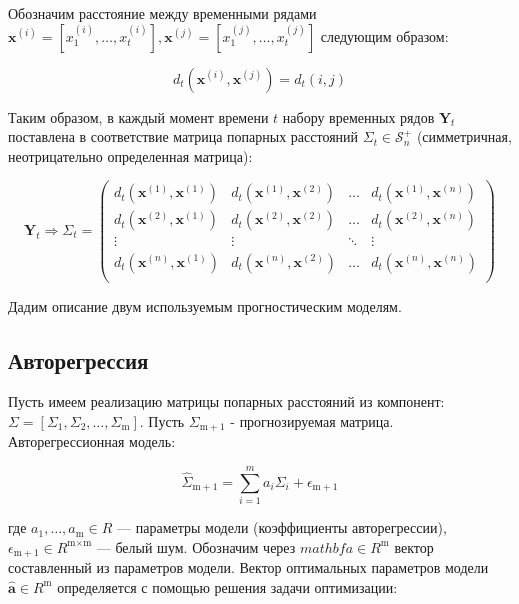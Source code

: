 \documentclass{article}
\begin{document}
Обозначим расстояние между временными рядами $\mathbf{x}^{(i)} = [x_1^{(i)}, \ldots, x_t^{(i)}], \mathbf{x}^{(j)} = [x^{(j)}_1, \ldots, x^{(j)}_t]$ следующим образом:

\begin{equation}
    d_t(\mathbf{x}^{(i)}, \mathbf{x}^{(j)}) = d_t(i, j)
\end{equation}

Таким образом, в каждый момент времени $t$ набору временных рядов $\mathbf{Y}_t$ поставлена в соответствие матрица попарных расстояний $\Sigma_t \in \mathcal{S}_n^+$ (симметричная, неотрицательно определенная матрица):

\begin{equation}
    \mathbf{Y}_t \Rightarrow \Sigma_t = \left(
\begin{array}{cccc}
d_t(\mathbf{x}^{(1)}, \mathbf{x}^{(1)}) & d_t(\mathbf{x}^{(1)}, \mathbf{x}^{(2)}) & \ldots & d_t(\mathbf{x}^{(1)}, \mathbf{x}^{(n)})\\
d_t(\mathbf{x}^{(2)}, \mathbf{x}^{(1)}) & d_t(\mathbf{x}^{(2)}, \mathbf{x}^{(2)}) & \ldots & d_t(\mathbf{x}^{(2)}, \mathbf{x}^{(n)})\\
\vdots & \vdots & \ddots & \vdots\\
d_t(\mathbf{x}^{(n)}, \mathbf{x}^{(1)}) & d_t(\mathbf{x}^{(n)}, \mathbf{x}^{(2)}) & \ldots & d_t(\mathbf{x}^{(n)}, \mathbf{x}^{(n)})\\
\end{array}
\right)
\end{equation}

Дадим описание двум используемым прогностическим моделям.

\subsection{Авторегрессия}

Пусть имеем реализацию матрицы попарных расстояний из  компонент: $\Sigma = [\Sigma_1, \Sigma_2, \ldots, \Sigma_\text{m}]$. Пусть $\Sigma_{\text{m} + 1}$ - прогнозируемая матрица. Авторегрессионная модель:

\begin{equation}
    \hat{\Sigma}_{\text{m} + 1} = \sum\limits_{i = 1}^m a_i\Sigma_{i} + \epsilon_{\text{m} + 1}
\end{equation}

где $a_1, \ldots, a_\text{m} \in R$ --- параметры модели (коэффициенты авторегрессии), $\epsilon_{\text{m} + 1} \in R^{\text{m} \times \text{m}}$ --- белый шум. Обозначим через $mathbf{a} \in R^{\text{m}}$ вектор составленный из параметров модели. Вектор оптимальных параметров модели $\hat{\mathbf{a}} \in R^{\text{m}}$ определяется с помощью решения задачи оптимизации:
\end{document}
